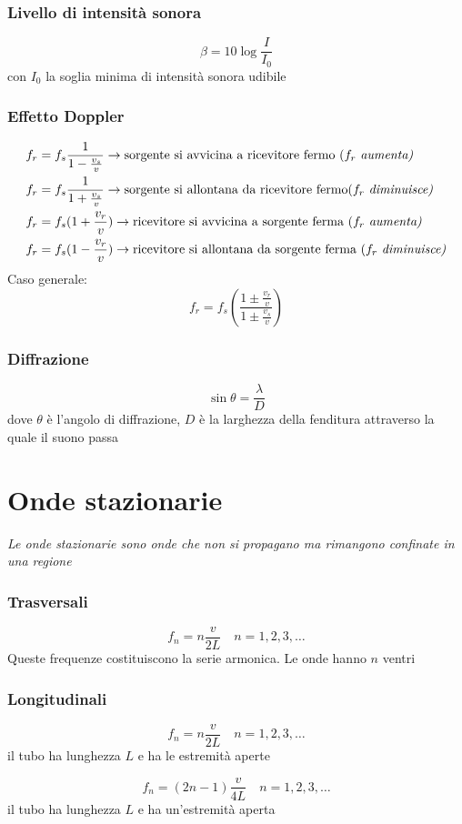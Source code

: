 \documentclass{article}
\begin{document}
\subsubsection*{Livello di intensità sonora}
$$ \beta = 10 \log\frac{I}{I_0} $$
con $I_0$ la soglia minima di intensità sonora udibile

\subsubsection*{Effetto Doppler}
\begin{align*}
    f_r &= f_s \frac{1}{1 - \frac{v_s}{v}} \rightarrow \text{sorgente si avvicina a ricevitore fermo ($f_r$ \textit{aumenta)}} \\
    f_r &= f_s \frac{1}{1 + \frac{v_s}{v}} \rightarrow \text{sorgente si allontana da ricevitore fermo($f_r$ \textit{diminuisce)}} \\
    f_r &= f_s(1 + \frac{v_r}{v}) \rightarrow \text{ricevitore si avvicina a sorgente ferma ($f_r$ \textit{aumenta)}} \\
    f_r &= f_s(1 - \frac{v_r}{v}) \rightarrow \text{ricevitore si allontana da sorgente ferma ($f_r$ \textit{diminuisce)}}
\end{align*}
Caso generale:
$$ f_r = f_s\left(\frac{1 \pm \frac{v_r}{v}}{1 \pm \frac{v_s}{v}}\right) $$

\subsubsection*{Diffrazione}
$$ \sin{\theta} = \frac{\lambda}{D} $$
dove $\theta$ è l'angolo di diffrazione, $D$ è la larghezza della fenditura attraverso la quale il suono passa

\section*{Onde stazionarie}
\textit{Le onde stazionarie sono onde che non si propagano ma rimangono confinate in una regione}

\subsubsection*{Trasversali}
$$ f_n = n \frac{v}{2L} \hspace{1em} n = 1,2,3,\dots $$
Queste frequenze costituiscono la serie armonica. Le onde hanno $n$ ventri

\subsubsection*{Longitudinali}
$$ f_n = n \frac{v}{2L} \hspace{1em} n = 1,2,3,\dots $$
il tubo ha lunghezza $L$ e ha le estremità aperte

\vspace{1em}
$$ f_n = (2n-1) \frac{v}{4L} \hspace{1em} n = 1,2,3,\dots $$
il tubo ha lunghezza $L$ e ha un'estremità aperta
\end{document}
